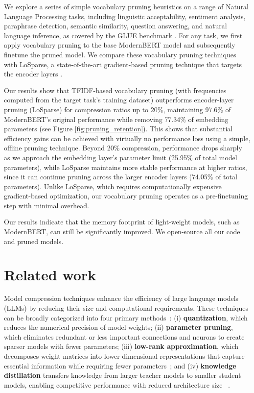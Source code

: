 \documentclass[twocolumn]{article}
\begin{document}
We explore a series of simple vocabulary pruning heuristics on a range of Natural Language Processing tasks, including linguistic acceptability, sentiment analysis, paraphrase detection, semantic similarity, question answering, and natural language inference, as covered by the GLUE benchmark \cite{wang2018glue}. For any task, we first apply vocabulary pruning to the base ModernBERT model and subsequently finetune the pruned model. We compare these vocabulary pruning techniques with LoSparse, a state-of-the-art gradient-based pruning technique that targets the encoder layers \cite{li2023losparse}.


Our results show that TFIDF-based vocabulary pruning (with frequencies computed from the target task's training dataset) outperforms encoder-layer pruning (LoSparse) for compression ratios up to 20\%, maintaining 97.6\% of ModernBERT's original performance while removing 77.34\% of embedding parameters (see Figure \ref{fig:pruning_retention}). This shows that substantial efficiency gains can be achieved with virtually no performance loss using a simple, offline pruning technique. Beyond 20\% compression, performance drops sharply as we approach the embedding layer's parameter limit (25.95\% of total model parameters), 
while LoSparse maintains more stable performance at higher ratios, since it can continue pruning across the larger encoder layers (74.05\% of total parameters). 
Unlike LoSparse, which requires computationally expensive gradient-based optimization, our vocabulary pruning operates as a pre-finetuning step with minimal overhead.


Our results indicate that the memory footprint of light-weight models, such as ModernBERT, can still be significantly improved.  We open-source all our code and pruned models.

\section{Related work}
Model compression techniques enhance the efficiency of large language models (LLMs) by reducing their size and computational requirements.
% 
These techniques can be broadly categorized into four primary methods~\cite{wan2023efficient}:
(i) \textbf{quantization}, which reduces the numerical precision of model weights;
(ii) \textbf{parameter pruning}, which eliminates redundant or less important connections and neurons to create sparser models with fewer parameters;
(iii) \textbf{low-rank approximation}, which decomposes weight matrices into lower-dimensional representations that capture essential information while requiring fewer parameters~\cite{Hu2021LoRA}; and
(iv) \textbf{knowledge distillation} transfers knowledge from larger teacher models to smaller student models, enabling competitive performance with reduced architecture size ~\cite{Hinton2015Distillation}.
\end{document}
